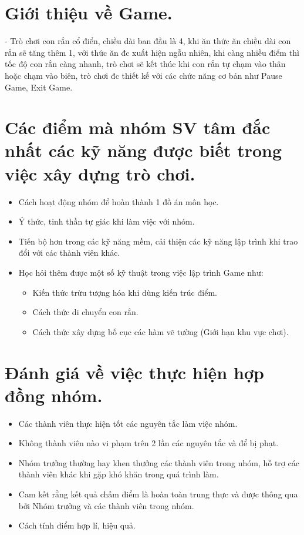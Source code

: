 \documentclass[12pt]{article}
\begin{document}
\section{Giới thiệu về Game.}
- Trò chơi con rắn cổ điển, chiều dài ban đầu là 4, khi ăn thức ăn chiều dài con rắn sẽ tăng thêm 1, với thức ăn đc xuất hiện ngẫu nhiên, khi càng nhiều điểm thì tốc độ con rắn càng nhanh, trò chơi sẽ kết thúc khi con rắn tự chạm vào thân hoặc chạm vào biên, trò chơi đc thiết kế với các chức năng cơ bản như Pause Game, Exit Game.
\section{Các điểm mà nhóm SV tâm đắc nhất các kỹ năng được biết trong việc xây dựng trò chơi.}
\begin{itemize}
    \item Cách hoạt động nhóm để hoàn thành 1 đồ án môn học.
    \item Ý thức, tinh thần tự giác khi làm việc với nhóm.
    \item Tiến bộ hơn trong các kỹ năng mềm, cải thiện các kỹ năng lập trình khi trao đổi với các thành viên khác.
    \item Học hỏi thêm được một số kỹ thuật trong việc lập trình Game như:
    \begin{itemize}
    \item Kiến thức trừu tượng hóa khi dùng kiến trúc điểm.
    \item Cách thức di chuyển con rắn.
    \item Cách thức xây dựng bố cục các hàm vẽ tường (Giới hạn khu vực chơi).
    \end{itemize}
\end{itemize}
\section{Đánh giá về việc thực hiện hợp đồng nhóm.}
\begin{itemize}
    \item Các thành viên thực hiện tốt các nguyên tắc làm việc nhóm.
    \item Không thành viên nào vi phạm trên 2 lần các nguyên tắc và để bị phạt.
    \item Nhóm trưởng thường hay khen thưởng các thành viên trong nhóm, hỗ trợ các thành viên khác khi gặp khó khăn trong quá trình làm.
    \item Cam kết rằng kết quả chấm điểm là hoàn toàn trung thực và được thông qua bởi Nhóm trưởng và các thành viên trong nhóm.
    \item Cách tính điểm hợp lí, hiệu quả.
\end{itemize}
\end{document}
